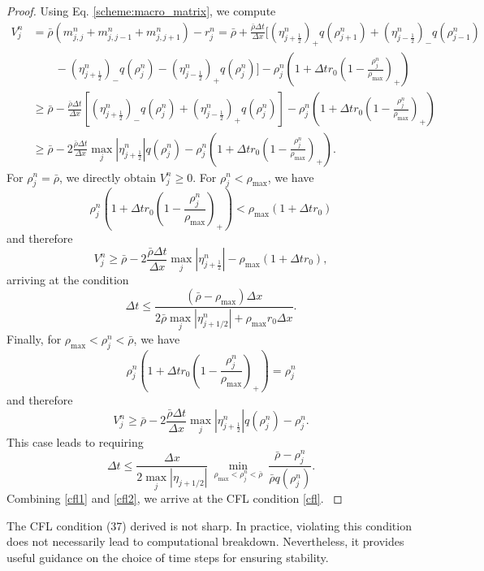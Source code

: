 \documentclass{aims} %
\theoremstyle{definition}
\begin{document}
\begin{proof}
{Using Eq. \eqref{scheme:macro_matrix}, we compute
\begin{equation*}
\begin{split}
    V^n_j &= \bar{\rho}(m_{j,j}^n + m_{j,j-1}^n + m_{j,j+1}^n) -r_j^n  = \bar{\rho} + \frac{\bar{\rho} \Delta t}{\Delta x} [(\eta_{j+\frac12}^n)_+ q(\rho_{j+1}^n) + (\eta_{j-\frac12}^n)_- q(\rho_{j-1}^n) \\ & \qquad - (\eta_{j+\frac12}^n)_- q(\rho_j^n) - (\eta_{j-\frac12}^n)_+ q(\rho_j^n) ] - \rho_j^n ( 1+ \Delta t r_0 ( 1 - \frac{\rho_j^n}{\rho_{\max}})_+) \\
    & \geq \bar{\rho} - \frac{\bar{\rho} \Delta t}{\Delta x} [ (\eta_{j+\frac12}^n)_- q(\rho_j^n) + (\eta_{j-\frac12}^n)_+ q(\rho_j^n) ] - \rho_j^n ( 1+ \Delta t r_0 ( 1 - \frac{\rho_j^n}{\rho_{\max}})_+)\\
    & \geq \bar{\rho} - 2\frac{\bar{\rho} \Delta t}{\Delta x} \max_j |\eta_{j+\frac12}^n| q(\rho_j^n) - \rho_j^n ( 1+ \Delta t r_0 ( 1 - \frac{\rho_j^n}{\rho_{\max}})_+).
\end{split}
\end{equation*}
\noindent For $\rho_j^n = \bar{\rho}$, we directly obtain $V_j^n \geq 0$. For $\rho_j^n <\rho_{\max}$, we have 
\begin{equation*}
\rho_j^n ( 1+ \Delta t r_0 ( 1 - \frac{\rho_j^n}{\rho_{\max}})_+) < \rho_{\max} (1+ \Delta t r_0)
\end{equation*}
and therefore
\begin{equation*}
V_j^n \geq \bar{\rho} - 2\frac{\bar{\rho} \Delta t}{\Delta x} \max_j |\eta_{j+\frac12}^n| - \rho_{\max} (1+ \Delta t r_0), 
\end{equation*}
arriving at the condition 
\begin{equation}\label{cfl1}
\Delta t \leq  \frac{(\bar{\rho} - \rho_{\max})\Delta x}{2 \bar{\rho} \max_j |\eta_{j+1/2}^n| + \rho_{\max} r_0 \Delta x}.
\end{equation}
Finally, for $\rho_{\max} < \rho_j^n < \bar{\rho}$, we have
\begin{equation*}
\rho_j^n ( 1+ \Delta t r_0 ( 1 - \frac{\rho_j^n}{\rho_{\max}})_+) = \rho_j^n 
\end{equation*}
and therefore
\begin{equation*}
V_j^n \geq \bar{\rho} - 2\frac{\bar{\rho} \Delta t}{\Delta x} \max_j |\eta_{j+\frac12}^n|q(\rho_j^n) - \rho_j^n. 
\end{equation*}
This case leads to requiring
\begin{equation}\label{cfl2}
{
\Delta t \leq \frac{\Delta x}{2 \max_j |\eta_{j+1/2}|}\ \underset{ \rho_{\max} < \rho_j^n < \bar{\rho}}{\min} \ \frac{\bar{\rho} - \rho_j^n}{\bar{\rho} q(\rho_j^n)}.}
\end{equation}
Combining \eqref{cfl1} and \eqref{cfl2}, we arrive at the CFL condition \eqref{cfl}.
}
\end{proof}
The CFL condition (37) derived is not sharp. In practice, violating this condition does not necessarily lead to computational breakdown. Nevertheless, it provides useful guidance on the choice of time steps for ensuring stability.
\end{document}

